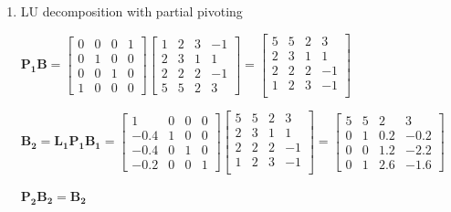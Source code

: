 \documentclass[english,onecolumn]{IEEEtran}
\begin{document}
\begin{enumerate}
\begin{enumerate}
		  \item LU decomposition with partial pivoting
		  
		  $\mathbf{P_1}\mathbf{B} = 
		  \begin{bmatrix}
		  	0 & 0 & 0 & 1\\
		  	0 & 1  & 0  & 0\\
		  	0 & 0 & 1 & 0\\
		  	1 & 0 & 0 & 0
		  \end{bmatrix}
	      \begin{bmatrix}
		  	1 & 2 & 3 & -1\\
		  	2 & 3 & 1 & 1\\
		  	2 & 2 & 2 & -1\\
		  	5 & 5 & 2 & 3
		  \end{bmatrix} = 
		  \begin{bmatrix}
		  	5 & 5 & 2 & 3\\
			2 & 3 & 1 & 1\\
			2 & 2 & 2 & -1\\
			1 & 2 & 3 & -1\\
		  \end{bmatrix}
	  $
	  
	  $
	  	\mathbf{B_2} = \mathbf{L_1P_1B_1}= 
	 	 \begin{bmatrix}
		  1 & 0 & 0 & 0\\
		  -0.4 & 1  & 0  & 0\\
		  -0.4 & 0 & 1& 0\\
		  -0.2 & 0 & 0 & 1
	 	 \end{bmatrix}
		\begin{bmatrix}
		  	5 & 5 & 2 & 3\\
			2 & 3 & 1 & 1\\
			2 & 2 & 2 & -1\\
			1 & 2 & 3 & -1\\
		\end{bmatrix}=
	 	 \begin{bmatrix}
		5 & 5 & 2 & 3\\
		0 & 1 & 0.2 & -0.2\\
		0 & 0 & 1.2 & -2.2\\
		0 & 1 & 2.6 & -1.6
		\end{bmatrix}	
		  $
		  
		  $\mathbf{P_2}\mathbf{B_2} = \mathbf{B_2}$
		  

\end{enumerate}
\end{enumerate}
\end{document}
